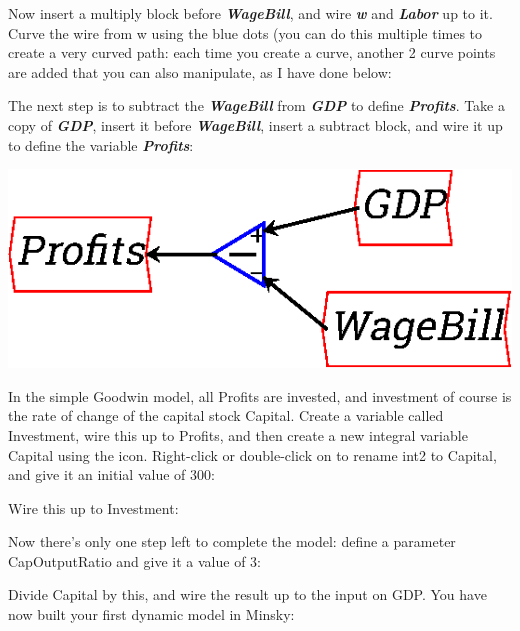 \begin{center}
\end{center}

Now insert a multiply block before {\bf\em WageBill}, and wire {\bf\em
w} and {\bf\em Labor} up to it. Curve the wire from w using the blue
dots (you can do this multiple times to create a very curved path:
each time you create a curve, another 2 curve points are added that
you can also manipulate, as I have done below: 



The next step is to subtract the {\bf\em WageBill} from {\bf\em GDP}
to define {\bf\em Profits}. Take a copy of {\bf\em GDP}, insert it
before {\bf\em WageBill}, insert a subtract block, and wire it up to
define the variable {\bf\em Profits}:

\begin{center}
\includegraphics{images/NewItem100.eps}
\end{center}


In the simple Goodwin model, all Profits are invested, and investment
of course is the rate of change of the capital stock Capital. Create a
variable called Investment, wire this up to Profits, and then create a
new integral variable Capital using the 
icon. Right-click or double-click on to rename int2 to Capital, and
give it an initial value of 300: 


Wire this up to Investment:


Now there's only one step left to complete the model: define a
parameter CapOutputRatio and give it a value of 3:



Divide Capital by this, and wire the result up to the input on
GDP. You have now built your first dynamic model in Minsky: 



